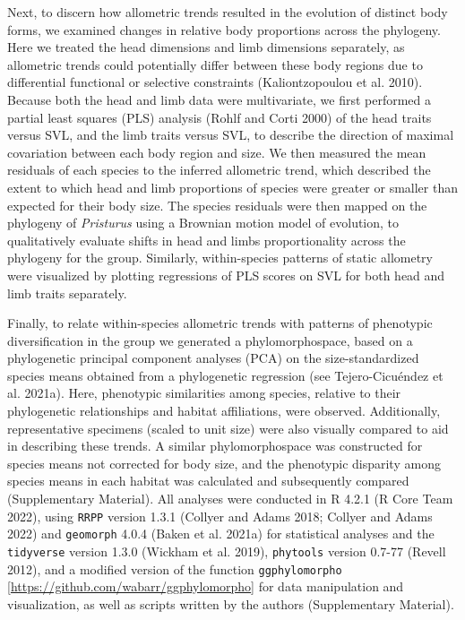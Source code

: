 \documentclass[
  11pt,
]{article}
\begin{document}
Next, to discern how allometric trends resulted in the evolution of
distinct body forms, we examined changes in relative body proportions
across the phylogeny. Here we treated the head dimensions and limb
dimensions separately, as allometric trends could potentially differ
between these body regions due to differential functional or selective
constraints (Kaliontzopoulou et al. 2010). Because both the head and
limb data were multivariate, we first performed a partial least squares
(PLS) analysis (Rohlf and Corti 2000) of the head traits versus SVL, and
the limb traits versus SVL, to describe the direction of maximal
covariation between each body region and size. We then measured the mean
residuals of each species to the inferred allometric trend, which
described the extent to which head and limb proportions of species were
greater or smaller than expected for their body size. The species
residuals were then mapped on the phylogeny of \emph{Pristurus} using a
Brownian motion model of evolution, to qualitatively evaluate shifts in
head and limbs proportionality across the phylogeny for the group.
Similarly, within-species patterns of static allometry were visualized
by plotting regressions of PLS scores on SVL for both head and limb
traits separately. \hfill\break

Finally, to relate within-species allometric trends with patterns of
phenotypic diversification in the group we generated a phylomorphospace,
based on a phylogenetic principal component analyses (PCA) on the
size-standardized species means obtained from a phylogenetic regression
(see Tejero-Cicuéndez et al. 2021a). Here, phenotypic similarities among
species, relative to their phylogenetic relationships and habitat
affiliations, were observed. Additionally, representative specimens
(scaled to unit size) were also visually compared to aid in describing
these trends. A similar phylomorphospace was constructed for species
means not corrected for body size, and the phenotypic disparity among
species means in each habitat was calculated and subsequently compared
(Supplementary Material). All analyses were conducted in R 4.2.1 (R Core
Team 2022), using \texttt{RRPP} version 1.3.1 (Collyer and Adams 2018;
Collyer and Adams 2022) and \texttt{geomorph} 4.0.4 (Baken et al. 2021a)
for statistical analyses and the \texttt{tidyverse} version 1.3.0
(Wickham et al. 2019), \texttt{phytools} version 0.7-77 (Revell 2012),
and a modified version of the function \texttt{ggphylomorpho}
{[}\url{https://github.com/wabarr/ggphylomorpho}{]} for data
manipulation and visualization, as well as scripts written by the
authors (Supplementary Material).
\end{document}
